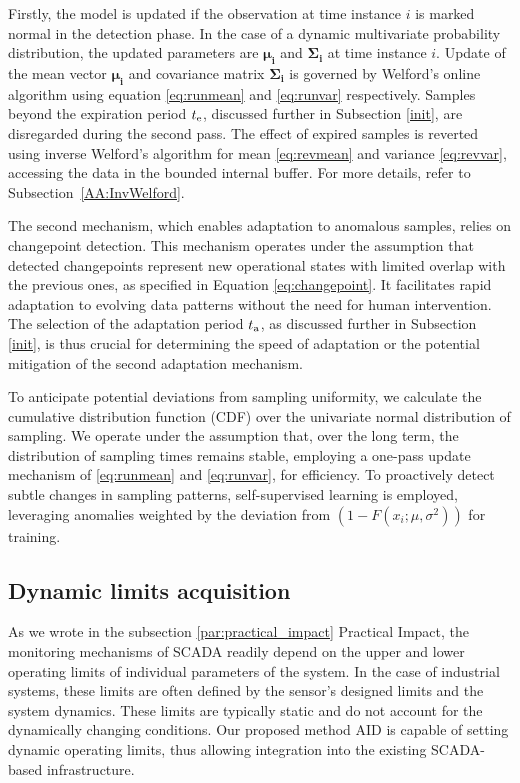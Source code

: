 Firstly, the model is updated if the observation at time instance \(i\) is marked normal in the detection phase. In the case of a dynamic multivariate probability distribution, the updated parameters are $\boldsymbol{\mu_i}$ and $\boldsymbol{\Sigma_i}$ at time instance \(i\). Update of the mean vector $\boldsymbol{\mu_i}$ and covariance matrix $\boldsymbol{\Sigma_i}$ is governed by Welford's online algorithm using equation \eqref{eq:runmean} and \eqref{eq:runvar} respectively. Samples beyond the expiration period $t _{\text{e}}$, discussed further in Subsection \ref{init}, are disregarded during the second pass. The effect of expired samples is reverted using inverse Welford's algorithm for mean \eqref{eq:revmean} and variance \eqref{eq:revvar}, accessing the data in the bounded internal buffer. For more details, refer to Subsection~\ref{AA:InvWelford}.

The second mechanism, which enables adaptation to anomalous samples, relies on changepoint detection. This mechanism operates under the assumption that detected changepoints represent new operational states with limited overlap with the previous ones, as specified in Equation \ref{eq:changepoint}. It facilitates rapid adaptation to evolving data patterns without the need for human intervention. The selection of the adaptation period $t _{\text{a}}$, as discussed further in Subsection \ref{init}, is thus crucial for determining the speed of adaptation or the potential mitigation of the second adaptation mechanism.

To anticipate potential deviations from sampling uniformity, we calculate the cumulative distribution function (CDF) over the univariate normal distribution of sampling. We operate under the assumption that, over the long term, the distribution of sampling times remains stable, employing a one-pass update mechanism of \eqref{eq:runmean} and \eqref{eq:runvar}, for efficiency. To proactively detect subtle changes in sampling patterns, self-supervised learning is employed, leveraging anomalies weighted by the deviation from $(1 - F(x_i; \mu, \sigma^2))$ for training.

\subsection{Dynamic limits acquisition}\label{limits}
As we wrote in the subsection \ref{par:practical_impact} Practical Impact, the monitoring mechanisms of SCADA readily depend on the upper and lower operating limits of individual parameters of the system. In the case of industrial systems, these limits are often defined by the sensor's designed limits and the system dynamics. These limits are typically static and do not account for the dynamically changing conditions. Our proposed method AID is capable of setting dynamic operating limits, thus allowing integration into the existing SCADA-based infrastructure.


